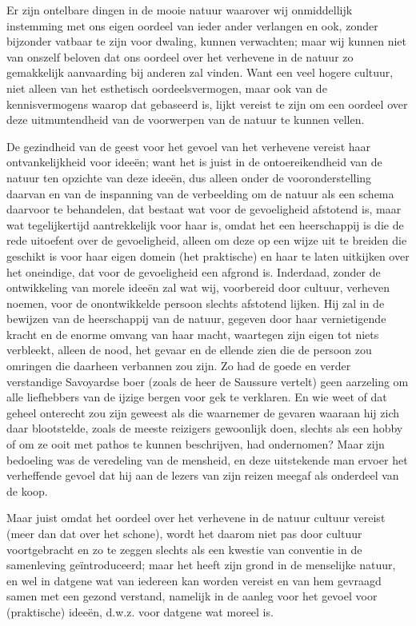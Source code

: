 Er zijn ontelbare dingen in de mooie natuur waarover wij onmiddellijk instemming met ons eigen oordeel van ieder ander verlangen en ook, zonder bijzonder vatbaar te zijn voor dwaling, kunnen verwachten; maar wij kunnen niet van onszelf beloven dat ons oordeel over het verhevene in de natuur zo gemakkelijk aanvaarding bij anderen zal vinden. Want een veel hogere cultuur, niet alleen van het esthetisch oordeelsvermogen, maar ook van de kennisvermogens waarop dat gebaseerd is, lijkt vereist te zijn om een oordeel over deze uitmuntendheid van de voorwerpen van de natuur te kunnen vellen.

De gezindheid van de geest voor het gevoel van het verhevene vereist haar ontvankelijkheid voor ideeën; want het is juist in de ontoereikendheid van de natuur ten opzichte van deze ideeën, dus alleen onder de vooronderstelling daarvan en van de inspanning van de verbeelding om de natuur als een schema daarvoor te behandelen, dat bestaat wat voor de gevoeligheid afstotend is, maar wat tegelijkertijd aantrekkelijk voor haar is, omdat het een heerschappij is die de rede uitoefent over de gevoeligheid, alleen om deze op een wijze uit te breiden die geschikt is voor haar eigen domein (het praktische) en haar te laten uitkijken over het oneindige, dat voor de gevoeligheid een afgrond is. Inderdaad, zonder de ontwikkeling van morele ideeën zal wat wij, voorbereid door cultuur, verheven noemen, voor de onontwikkelde persoon slechts afstotend lijken. Hij zal in de bewijzen van de heerschappij van de natuur, gegeven door haar vernietigende kracht en de enorme omvang van haar macht, waartegen zijn eigen tot niets verbleekt, alleen de nood, het gevaar en de ellende zien die de persoon zou omringen die daarheen verbannen zou zijn. Zo had de goede en verder verstandige Savoyardse boer (zoals de heer de Saussure vertelt) geen aarzeling om alle liefhebbers van de ijzige bergen voor gek te verklaren. En wie weet of dat geheel onterecht zou zijn geweest als die waarnemer de gevaren waaraan hij zich daar blootstelde, zoals de meeste reizigers gewoonlijk doen, slechts als een hobby of om ze ooit met pathos te kunnen beschrijven, had ondernomen? Maar zijn bedoeling was de veredeling van de mensheid, en deze uitstekende man ervoer het verheffende gevoel dat hij aan de lezers van zijn reizen meegaf als onderdeel van de koop.

Maar juist omdat het oordeel over het verhevene in de natuur cultuur vereist (meer dan dat over het schone), wordt het daarom niet pas door cultuur voortgebracht en zo te zeggen slechts als een kwestie van conventie in de samenleving geïntroduceerd; maar het heeft zijn grond in de menselijke natuur, en wel in datgene wat van iedereen kan worden vereist en van hem gevraagd samen met een gezond verstand, namelijk in de aanleg voor het gevoel voor (praktische) ideeën, d.w.z. voor datgene wat moreel is.

